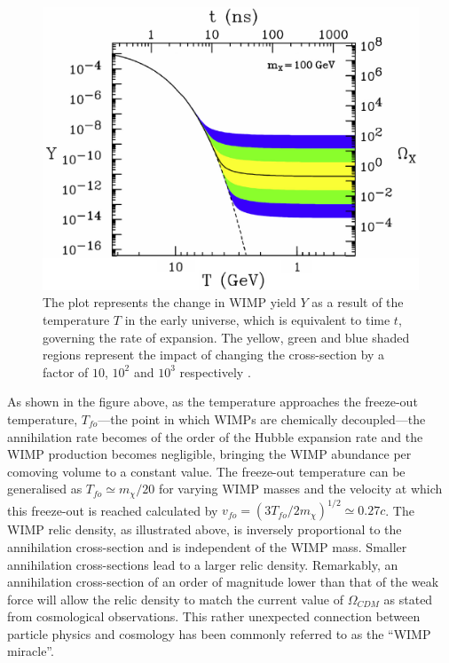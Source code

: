 \begin{figure}[h!]
    \begin{center}
        \includegraphics[scale=0.6]{Chapter_1/Figures/WIMP_Freezeout.pdf}
        \caption[Typical evolution of the WIMP number density in the early universe during the epoch of WIMP chemical freeze-out.]%
        {The plot represents the change in WIMP yield $Y$ as a result of the temperature $T$ in the early universe, which is equivalent to time $t$, governing the rate of expansion. The yellow, green and blue shaded regions represent the impact of changing the cross-section by a factor of $10$, $10^{2}$ and $10^{3}$ respectively \cite{Feng_2010}.}
        \label{fig:wimp_density_evolution}
        \end{center}
\end{figure}

As shown in the figure above, as the temperature approaches the freeze-out temperature, $T_{fo}$---the point in which WIMPs are chemically decoupled---the annihilation rate becomes of the order of the Hubble expansion rate and the WIMP production becomes negligible, bringing the WIMP abundance per comoving volume to a constant value. The freeze-out temperature can be generalised as $T_{fo} \simeq m_\chi/20$ for varying WIMP masses and the velocity at which this freeze-out is reached calculated by $v_{fo} = (3T_{fo}/2m_{\chi})^{1/2} \simeq 0.27c$. The WIMP relic density, as illustrated above, is inversely proportional to the annihilation cross-section and is independent of the WIMP mass. Smaller annihilation cross-sections lead to a larger relic density. Remarkably, an annihilation cross-section of an order of magnitude lower than that of the weak force will allow the relic density to match the current value of $\Omega_{CDM}$ as stated from cosmological observations. This rather unexpected connection between particle physics and cosmology has been commonly referred to as the “WIMP miracle”.


